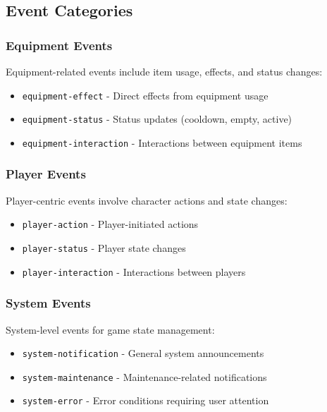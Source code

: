 \documentclass[12pt,a4paper]{article}
\begin{document}
\subsection{Event Categories}

\subsubsection{Equipment Events}

Equipment-related events include item usage, effects, and status changes:

\begin{itemize}
\item \texttt{equipment-effect} - Direct effects from equipment usage
\item \texttt{equipment-status} - Status updates (cooldown, empty, active)
\item \texttt{equipment-interaction} - Interactions between equipment items
\end{itemize}

\subsubsection{Player Events}

Player-centric events involve character actions and state changes:

\begin{itemize}
\item \texttt{player-action} - Player-initiated actions
\item \texttt{player-status} - Player state changes
\item \texttt{player-interaction} - Interactions between players
\end{itemize}

\subsubsection{System Events}

System-level events for game state management:

\begin{itemize}
\item \texttt{system-notification} - General system announcements
\item \texttt{system-maintenance} - Maintenance-related notifications
\item \texttt{system-error} - Error conditions requiring user attention
\end{itemize}
\end{document}
